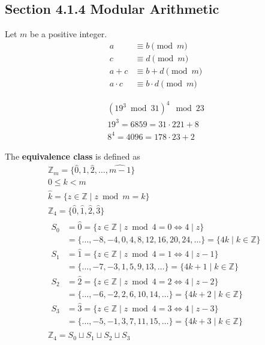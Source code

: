 \documentclass[letterpaper, 12pt]{article}
\newenvironment{definition}[1][Definition]{\begin{trivlist}
\item[\hskip \labelsep {\bfseries #1}]}{\end{trivlist}}
\newenvironment{example}[1][Example]{\begin{trivlist}
\item[\hskip \labelsep {\bfseries #1}]}{\end{trivlist}}
\newcommand{\keyword}[1]{\textbf{#1}}
\newcommand{\Z}{\mathbb{Z}}
\newcommand{\0}{\emptyset}
\begin{document}
    \subsection*{Section 4.1.4 Modular Arithmetic}
    Let $m$ be a positive integer.
    \begin{align*}
        a &\equiv b \pmod m \\
        c &\equiv d \pmod m \\
        \hline
        a + c &\equiv b + d \pmod m \\
        a \cdot c &\equiv b \cdot d \pmod m
    \end{align*}
    \begin{example}
        \begin{gather*}
            (19^3 \bmod 31)^4 \mod 23 \\
            19^3 = 6859 = 31 \cdot 221 + 8 \\
            8^4 = 4096 = 178 \cdot 23 + 2
        \end{gather*}
    \end{example}
    \begin{definition}
        The \keyword{equivalence class} is defined as
        \begin{gather*}
            \Z_m = \{\hat{0}, \hat{1}, \hat{2}, \dots, \widehat{m - 1}\} \\
            0 \le k < m \\
            \hat{k} = \{z \in \Z \mid z \bmod m = k\} \\
            \Z_4 = \{\hat{0}, \hat{1}, \hat{2}, \hat{3}\} \\
            \begin{aligned}
                S_0 &= \hat{0} = \{z \in \Z \mid z \bmod 4 = 0 \iff 4 \mid z\} \\
                &= \{\dots, -8, -4, 0, 4, 8, 12, 16, 20, 24, \dots\} = \{4k \mid k \in \Z\} \\
                S_1 &= \hat{1} = \{z \in \Z \mid z \bmod 4 = 1 \iff 4 \mid z - 1\} \\
                &= \{\dots, -7, -3, 1, 5, 9, 13, \dots\} = \{4k + 1 \mid k \in \Z\} \\
                S_2 &= \hat{2} = \{z \in \Z \mid z \bmod 4 = 2 \iff 4 \mid z - 2\} \\
                &= \{\dots, -6, -2, 2, 6, 10, 14, \dots\} = \{4k + 2 \mid k \in \Z\} \\
                S_3 &= \hat{3} = \{z \in \Z \mid z \bmod 4 = 3 \iff 4 \mid z - 3\} \\
                &= \{\dots, -5, -1, 3, 7, 11, 15, \dots\} = \{4k + 3 \mid k \in \Z\}
            \end{aligned} \\
            \Z_4 = S_0 \sqcup S_1 \sqcup S_2 \sqcup S_3
        \end{gather*}
    \end{definition}
\end{document}
